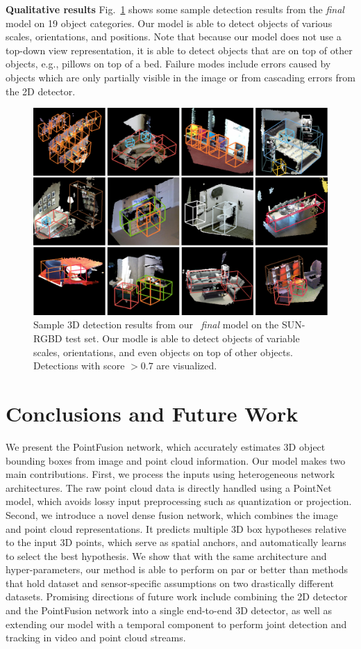\documentclass[10pt,twocolumn,letterpaper]{article}
\begin{document}
\textbf{Qualitative results} Fig.~\ref{fig:sun-qualitative} shows some sample detection results from the \textit{final} model on 19 object categories. Our model is able to detect objects of various scales, orientations, and positions. Note that because our model does not use a top-down view representation, it is able to detect objects that are on top of other objects, e.g., pillows on top of a bed. Failure modes include errors caused by objects which are only partially visible in the image or from cascading errors from the 2D detector. 

\begin{figure}[]
\centering
\includegraphics[width=\linewidth]{sun-qualitative-3x4.png}
\caption{Sample 3D detection results from our ~\textit{final} model on the SUN-RGBD test set. Our modle is able to detect objects of variable scales, orientations, and even objects on top of other objects. Detections with score $> 0.7$ are visualized.}
\label{fig:sun-qualitative}
\end{figure}

\section{Conclusions and Future Work}
We present the PointFusion network, which accurately estimates 3D object bounding boxes from image and point cloud information. Our model makes two main contributions. First, we process the inputs using heterogeneous network architectures. The raw point cloud data is directly handled using a PointNet model, which avoids lossy input preprocessing such as quantization or projection. Second, we introduce a novel dense fusion network, which combines the image and point cloud representations. It predicts multiple 3D box hypotheses relative to the input 3D points, which serve as spatial anchors, and automatically learns to select the best hypothesis. We show that with the same architecture and hyper-parameters, our method is able to perform on par or better than methods that hold dataset and sensor-specific assumptions on two drastically different datasets. Promising directions of future work include combining the 2D detector and the PointFusion network into a single end-to-end 3D detector, as well as extending our model with a temporal component to perform joint detection and tracking in video and point cloud streams. 
\end{document}
